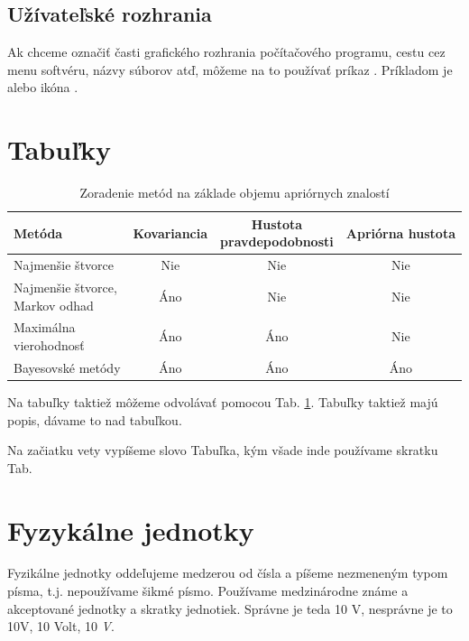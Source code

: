 \subsection{Užívateľské rozhrania}

Ak chceme označiť časti grafického rozhrania počítačového programu, cestu cez menu softvéru, názvy súborov atď, môžeme na to používať príkaz . Príkladom je  alebo ikóna .

\section{Tabuľky}


\begin{table}[htb]
	\centering
	\caption{Zoradenie metód na základe objemu apriórnych znalostí}
	\begin{tabular}{ |l|c|c|c| }
		\hline
		\parbox[c]{3.5cm}{Metóda} & Kovariancia & \parbox[c]{3cm}{Hustota\\pravdepodobnosti}& Apriórna hustota\\ [0.2cm] \hline
		\parbox[c]{3.5cm}{Najmenšie štvorce} & Nie & Nie & Nie \\ [0.2cm] \hline
		\parbox[c]{3.5cm}{Najmenšie štvorce,\\Markov odhad}& Áno & Nie & Nie \\ [0.2cm]   \hline
		\parbox[c]{3.5cm}{Maximálna\\vierohodnosť}& Áno & Áno & Nie \\ [0.2cm] \hline
		\parbox[c]{3.5cm}{Bayesovské metódy} & Áno & Áno & Áno \\ [0.2cm] \hline
	\end{tabular}
	\label{TABULKA_3_1}
\end{table}

Na tabuľky taktiež môžeme odvolávať pomocou Tab. \ref{TABULKA_3_1}. Tabuľky taktiež majú popis, dávame to nad tabuľkou.

Na začiatku vety vypíšeme slovo Tabuľka, kým všade inde používame skratku Tab.

\section{Fyzykálne jednotky}

Fyzikálne jednotky oddeľujeme medzerou od čísla a píšeme nezmeneným typom písma, t.j. nepoužívame šikmé písmo. Používame medzinárodne známe a akceptované jednotky a skratky jednotiek. Správne je teda 10 V, nesprávne je to 10V, 10 Volt, 10 \emph{V}.


